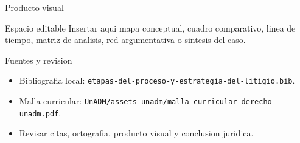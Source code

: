 \documentclass[
  spanish,
  aspectratio=169,
  xcolor={dvipsnames,table}
]{beamer}
\begin{document}
\begin{frame}{Producto visual}
  \begin{block}{Espacio editable}
    Insertar aqui mapa conceptual, cuadro comparativo, linea de tiempo,
    matriz de analisis, red argumentativa o sintesis del caso.
  \end{block}
  \centering
\end{frame}

\begin{frame}{Fuentes y revision}
  \begin{itemize}
    \item Bibliografia local: \texttt{etapas-del-proceso-y-estrategia-del-litigio.bib}.
    \item Malla curricular: \texttt{UnADM/assets-unadm/malla-curricular-derecho-unadm.pdf}.
    \item Revisar citas, ortografia, producto visual y conclusion juridica.
  \end{itemize}
\end{frame}
\end{document}
